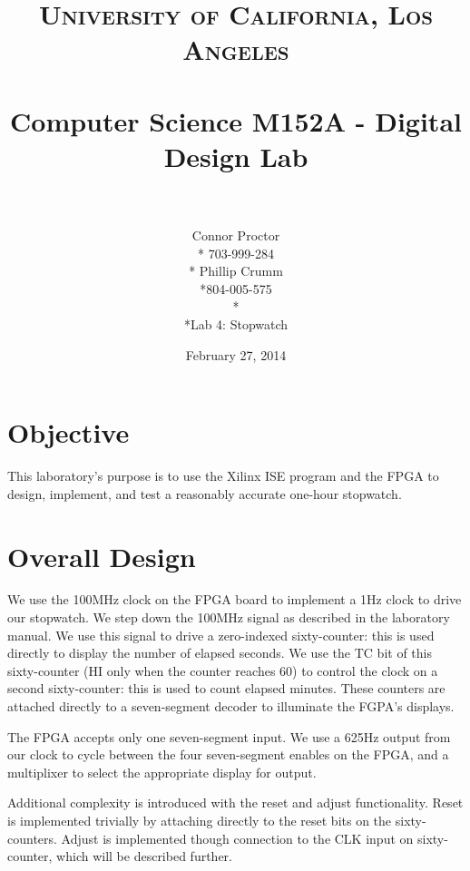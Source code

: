 \documentclass[paper=letter, fontsize=11pt]{scrartcl}
\title{	
\normalfont \normalsize 
\textsc{University of California, Los Angeles} \\ [25pt]
\horrule{0.5pt} \\[0.4cm]
\Large Computer Science M152A - Digital Design Lab \\
\horrule{2pt} \\[0.5cm]
}
\author{Connor Proctor \\* 703-999-284 \\* Phillip Crumm \\*804-005-575 \\* \\*Lab 4: Stopwatch}
\date{\normalsize February 27, 2014}
\begin{document}
\clearpage\maketitle
\thispagestyle{empty}
\pagebreak


\section{Objective}
This laboratory's purpose is to use the Xilinx ISE program and the FPGA to design, implement, and test a reasonably accurate one-hour stopwatch.

\section{Overall Design}
We use the 100MHz clock on the FPGA board to implement a 1Hz clock to drive our stopwatch. We step down the 100MHz signal as described in the laboratory manual. We use this signal to drive a zero-indexed sixty-counter: this is used directly to display the number of elapsed seconds. We use the TC bit of this sixty-counter (HI only when the counter reaches 60) to control the clock on a second sixty-counter: this is used to count elapsed minutes. These counters are attached directly to a seven-segment decoder to illuminate the FGPA's displays.

The FPGA accepts only one seven-segment input. We use a 625Hz output from our clock to cycle between the four seven-segment enables on the FPGA, and a multiplixer to select the appropriate display for output.

Additional complexity is introduced with the reset and adjust functionality. Reset is implemented trivially by attaching directly to the reset bits on the sixty-counters. Adjust is implemented though connection to the CLK input on sixty-counter, which will be described further.
\end{document}
